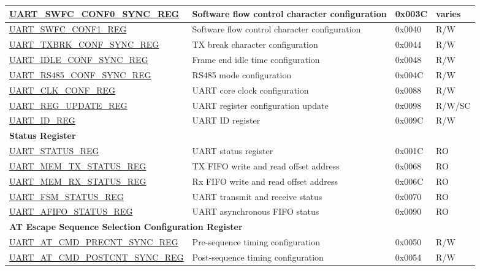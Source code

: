 \begin{longtable}{ | p{6.1cm} | p{7cm} | p{1.3cm} | p{1.6cm} | }
\hyperref[regdesc:UARTSWFCCONF0SYNCREG]{UART\_SWFC\_CONF0\_SYNC\_REG} & Software flow control character configuration & 0x003C & varies \\ \hline
\hyperref[regdesc:UARTSWFCCONF1REG]{UART\_SWFC\_CONF1\_REG} & Software flow control character configuration & 0x0040 & R/W \\ \hline
\hyperref[regdesc:UARTTXBRKCONFSYNCREG]{UART\_TXBRK\_CONF\_SYNC\_REG} & TX break character configuration & 0x0044 & R/W \\ \hline
\hyperref[regdesc:UARTIDLECONFSYNCREG]{UART\_IDLE\_CONF\_SYNC\_REG} & Frame end idle time configuration & 0x0048 & R/W \\ \hline
\hyperref[regdesc:UARTRS485CONFSYNCREG]{UART\_RS485\_CONF\_SYNC\_REG} & RS485 mode configuration & 0x004C & R/W \\ \hline
\hyperref[regdesc:UARTCLKCONFREG]{UART\_CLK\_CONF\_REG} & UART core clock configuration & 0x0088 & R/W \\ \hline
\hyperref[regdesc:UARTREGUPDATEREG]{UART\_REG\_UPDATE\_REG} & UART register configuration update & 0x0098 & R/W/SC \\ \hline
\hyperref[regdesc:UARTIDREG]{UART\_ID\_REG} & UART ID register & 0x009C & R/W \\ \hline
\multicolumn{4}{|l|}{\textbf{Status Register}} \\ \hline
\hyperref[regdesc:UARTSTATUSREG]{UART\_STATUS\_REG} & UART status register & 0x001C & RO \\ \hline
\hyperref[regdesc:UARTMEMTXSTATUSREG]{UART\_MEM\_TX\_STATUS\_REG} & TX FIFO write and read offset address & 0x0068 & RO \\ \hline
\hyperref[regdesc:UARTMEMRXSTATUSREG]{UART\_MEM\_RX\_STATUS\_REG} & Rx FIFO write and read offset address & 0x006C & RO \\ \hline
\hyperref[regdesc:UARTFSMSTATUSREG]{UART\_FSM\_STATUS\_REG} & UART transmit and receive status & 0x0070 & RO \\ \hline
\hyperref[regdesc:UARTAFIFOSTATUSREG]{UART\_AFIFO\_STATUS\_REG} & UART asynchronous FIFO status & 0x0090 & RO \\ \hline
\multicolumn{4}{|l|}{\textbf{AT Escape Sequence Selection Configuration  Register}} \\ \hline
\hyperref[regdesc:UARTATCMDPRECNTSYNCREG]{UART\_AT\_CMD\_PRECNT\_SYNC\_REG} & Pre-sequence timing configuration & 0x0050 & R/W \\ \hline
\hyperref[regdesc:UARTATCMDPOSTCNTSYNCREG]{UART\_AT\_CMD\_POSTCNT\_SYNC\_REG} & Post-sequence timing configuration & 0x0054 & R/W \\ \hline

\end{longtable}
